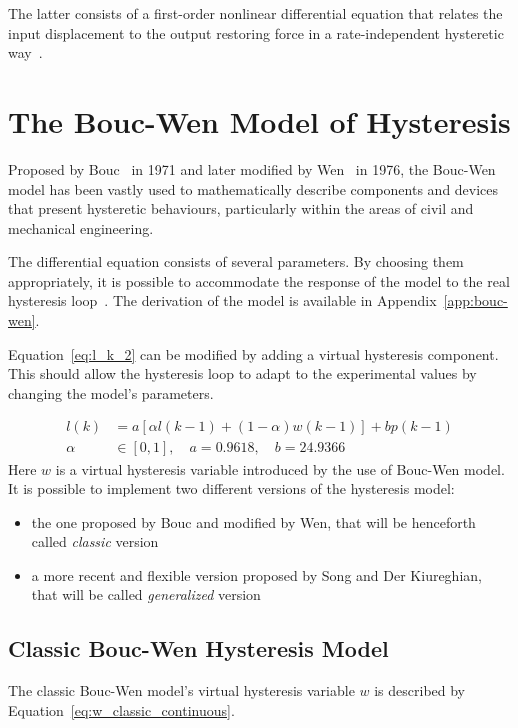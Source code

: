 The latter consists of a first-order nonlinear differential equation that relates
the input displacement to the output restoring force
in a rate-independent hysteretic way~\cite{krasnosel2012systems}.

\section{The Bouc-Wen Model of Hysteresis}

Proposed by Bouc~\cite{bouc} in 1971 and later modified by Wen~\cite{bouc_wen} in 1976,
the Bouc-Wen model has been vastly used to mathematically describe components and devices
that present hysteretic behaviours, particularly within
the areas of civil and mechanical engineering.

The differential equation consists of several parameters. By choosing them appropriately,
it is possible to accommodate the response of the model to the real hysteresis
loop~\cite{ismail2009hysteresis}.
The derivation of the model is available in Appendix~\ref{app:bouc-wen}.

Equation~\ref{eq:l_k_2} can be modified by adding a virtual hysteresis component.
This should allow the hysteresis loop to adapt to the experimental values by changing
the model's parameters.

\begin{align}
\label{eq:l_w}
l(k) &= a \left [\alpha l(k-1) + (1-\alpha)w(k-1) \right] + bp(k-1) \\
\alpha &\in \left[0,1\right],\quad a = 0.9618, \quad b=24.9366 \nonumber
\end{align}
Here $w$ is a virtual hysteresis variable introduced by the use of Bouc-Wen model.
It is possible to implement two different versions of the hysteresis model:
\begin{itemize}[noitemsep]
	\item the one proposed by Bouc and modified by Wen, that will be henceforth called \textit{classic} version
	\item a more recent and flexible version proposed by Song and Der Kiureghian, that will be called \textit{generalized} version
\end{itemize}

\subsection{Classic Bouc-Wen Hysteresis Model}
The classic Bouc-Wen model's virtual hysteresis variable $w$ is described by Equation~\ref{eq:w_classic_continuous}.

